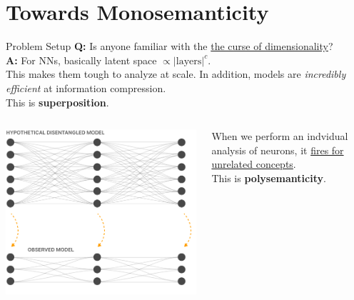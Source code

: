 \documentclass{beamer}
\begin{document}
\section{Towards Monosemanticity}
\begin{frame}{Problem Setup}
	\textbf{Q:} Is anyone familiar with the \underline{the curse of dimensionality}? \pause \\
	\textbf{A:} For NNs, basically latent space $\propto|\text{layers}|^c$. \newline \\

	This makes them tough to analyze at scale. \pause In addition, models are \textit{incredibly efficient} at information compression. \pause \newline \\

	This is \textbf{superposition}.
	\begin{columns}
		\begin{column}{.44\textwidth}
			\begin{center}
				\includegraphics[width=\textwidth]{img/superposition.png}
			\end{center} \pause
		\end{column}
		\begin{column}{.5\textwidth}
			When we perform an indvidual analysis of neurons, it \underline{fires for unrelated concepts}. \newline \\

			This is \textbf{polysemanticity}.
		\end{column}
	\end{columns}
\end{frame}
\end{document}
